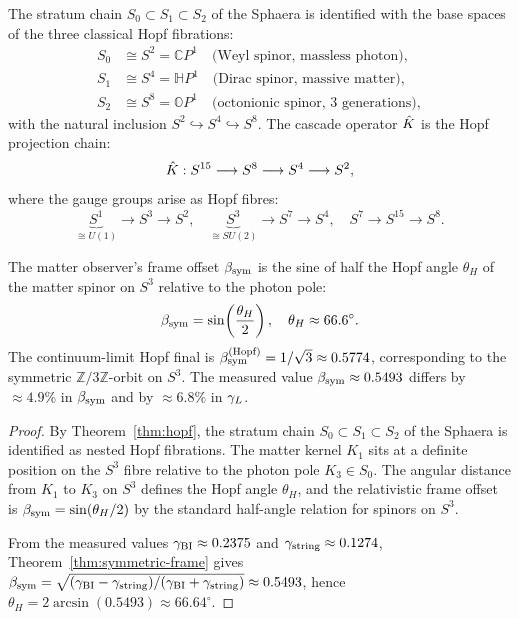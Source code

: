 \begin{theorem}\label{thm:hopf}
The stratum chain $S_0\subset S_1\subset S_2$ of the Sphaera is
identified with the base spaces of the three classical Hopf fibrations:
\begin{align*}
 S_0 &\cong S^2 = \mathbb{C}P^1
 \quad\text{(Weyl spinor, massless photon)},\\
 S_1 &\cong S^4 = \mathbb{H}P^1
 \quad\text{(Dirac spinor, massive matter)},\\
 S_2 &\cong S^8 = \mathbb{O}P^1
 \quad\text{(octonionic spinor, 3 generations)},
\end{align*}
with the natural inclusion $S^2\hookrightarrow S^4\hookrightarrow S^8$.
The cascade operator $\hat{K}$ is the Hopf projection chain:
\[
 \hat{K}: S^{15}\longrightarrow S^8\longrightarrow S^4\longrightarrow S^2,
\]
where the gauge groups arise as Hopf fibres:
\[
 \underbrace{S^1}_{\cong U(1)}\to S^3\to S^2,\quad
 \underbrace{S^3}_{\cong SU(2)}\to S^7\to S^4,\quad
 S^7\longrightarrow S^{15}\longrightarrow S^8.
\]
\end{theorem}


\begin{theorem}
\label{thm:bsym-hopf}
The matter observer's frame offset $\beta_{\mathrm{sym}}$ is the sine of half the Hopf
angle $\theta_H$ of the matter spinor on $S^3$ relative to the photon
pole:
\[
 \beta_{\mathrm{sym}} = \sin\!\left(\frac{\theta_H}{2}\right),\quad\theta_H\approx 66.6^\circ.
\]
The continuum-limit Hopf final is $\beta_{\mathrm{sym}}^{(\rm Hopf)}=1/\sqrt{3}\approx
0.5774$, corresponding to the symmetric $\mathbb{Z}/3\mathbb{Z}$-orbit
on $S^3$. The measured value $\beta_{\mathrm{sym}}\approx 0.5493$ differs by
$\approx 4.9\%$ in $\beta_{\mathrm{sym}}$ and by $\approx 6.8\%$ in $\gamma_L$.
\end{theorem}

\begin{proof}
By Theorem~\ref{thm:hopf}, the stratum chain
$S_0\subset S_1\subset S_2$ of the Sphaera is identified as nested Hopf
fibrations. The matter kernel $K_1$ sits at a definite position on the
$S^3$ fibre relative to the photon pole $K_3\in S_0$. The angular
distance from $K_1$ to $K_3$ on $S^3$ defines the Hopf angle $\theta_H$,
and the relativistic frame offset is $\beta_{\mathrm{sym}}=\sin(\theta_H/2)$ by the
standard half-angle relation for spinors on $S^3$.

From the measured values $\gamma_{\mathrm{BI}}\approx 0.2375$ and
$\gamma_{\mathrm{string}}\approx 0.1274$, Theorem~\ref{thm:symmetric-frame} gives
$\beta_{\mathrm{sym}}=\sqrt{(\gamma_{\mathrm{BI}}-\gamma_{\mathrm{string}})/(\gamma_{\mathrm{BI}}+\gamma_{\mathrm{string}})}\approx 0.5493$, hence
$\theta_H=2\arcsin(0.5493)\approx 66.64^\circ$.
\end{proof}


